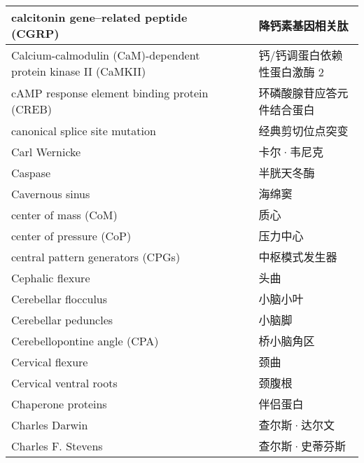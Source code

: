 \begin{longtable}{lll}
	\midrule
	calcitonin gene–related peptide (CGRP)   && 降钙素基因相关肽  \\
	
	\midrule
	Calcium-calmodulin (CaM)-dependent protein kinase II (CaMKII)   && 钙/钙调蛋白依赖性蛋白激酶 2  \\
	
	\midrule
	cAMP response element binding protein (CREB)  && 环磷酸腺苷应答元件结合蛋白  \\
	
	\midrule
	canonical splice site mutation   && 经典剪切位点突变  \\
	
	\midrule
	Carl Wernicke   && 卡尔·韦尼克  \\
	
	\midrule
	Caspase   && 半胱天冬酶  \\
	
	\midrule
	Cavernous sinus   && 海绵窦  \\
	
	\midrule
	center of mass (CoM)   && 质心  \\
	
	\midrule
	center of pressure (CoP)   && 压力中心  \\
	
	\midrule
	central pattern generators (CPGs)   && 中枢模式发生器  \\
	
	\midrule
	Cephalic flexure   && 头曲  \\
	
	\midrule
	Cerebellar flocculus   && 小脑小叶  \\
	
	\midrule
	Cerebellar peduncles   && 小脑脚  \\
	
	\midrule
	Cerebellopontine angle (CPA)   && 桥小脑角区  \\
	
	\midrule
	Cervical flexure   && 颈曲  \\
	
	\midrule
	Cervical ventral roots   && 颈腹根  \\
	
	\midrule
	Chaperone proteins   && 伴侣蛋白  \\
	
	\midrule
	Charles Darwin   && 查尔斯·达尔文  \\
	
	\midrule
	Charles F. Stevens   && 查尔斯·史蒂芬斯  \\
	

\end{longtable}
